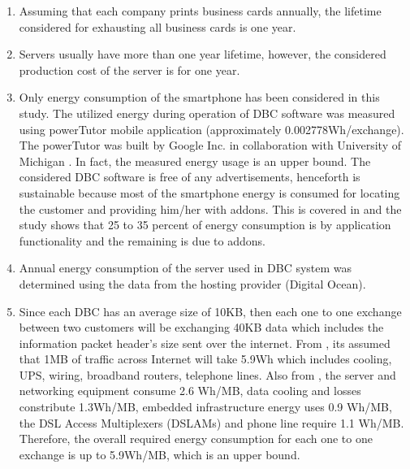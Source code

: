 \documentclass[conference]{IEEEtran}
\begin{document}
 \begin{enumerate}
 \item Assuming that each company prints business cards annually, the lifetime considered for exhausting all business cards is one year.
\item Servers usually have more than one year lifetime, however, the considered production cost of the server is for one year.
\item Only energy consumption of the smartphone has been considered in this study. The utilized energy during operation of DBC software was measured using powerTutor mobile application (approximately 0.002778Wh/exchange). The powerTutor was built by  Google Inc. in collaboration with University of Michigan \cite{zhang2010accurate}. In fact, the measured energy usage is an upper bound. The considered DBC software is free of any advertisements, henceforth is sustainable because most of the smartphone energy is consumed for locating the customer and providing him/her with addons. This is covered in \cite{pathak2012energy} and the study shows that 25 to 35 percent of energy consumption is by application functionality and the remaining is due to addons.
 \item Annual energy consumption of the server used in DBC system was determined using the data from the hosting provider (Digital Ocean).
 \item Since each DBC has an average size of 10KB, then each one to one exchange between two customers will be exchanging 40KB data which includes the information packet header's size sent over the internet. From \cite{Moshnyaga:2013}, its assumed that 1MB of traffic across Internet will take 5.9Wh which includes cooling, UPS, wiring, broadband routers, telephone lines. Also from \cite{EnergyDownload}, the server and networking equipment consume 2.6 Wh/MB, data cooling and losses constribute 1.3Wh/MB, embedded infrastructure energy uses 0.9 Wh/MB, the DSL Access Multiplexers (DSLAMs) and phone line require 1.1 Wh/MB. Therefore, the overall required energy consumption for each one to one exchange is up to 5.9Wh/MB,  which is an upper bound.
 \end{enumerate}
 
\end{document}
